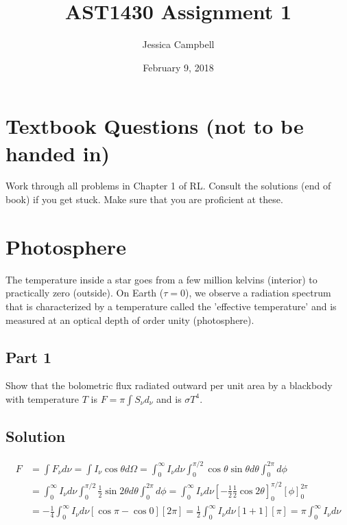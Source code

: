 \documentclass[12pt]{article}
\begin{document}
 
 
\title{AST1430 Assignment 1}
\author{Jessica Campbell}
\date{February 9, 2018}
\maketitle


\section{Textbook Questions (not to be handed in)}

Work through all problems in Chapter 1 of RL. Consult the solutions (end of book) if you get stuck. Make sure that you are proficient at these.

\section{Photosphere}

The temperature inside a star goes from a few million kelvins (interior) to practically zero (outside). On Earth ($\tau=0$), we observe a radiation spectrum that is characterized by a temperature called the ’effective temperature’ and is measured at an optical depth of order unity (photosphere).\\

\subsection*{Part 1}

{\noindent}Show that the bolometric flux radiated outward per unit area by a blackbody with temperature $T$ is $F = {\pi}{\int}S_{\nu}d_{\nu}$ and is ${\sigma}T^4$.

\subsection*{Solution}

\begin{equation*}
\begin{split}
F &= \int F_\nu d\nu = \int I_\nu \cos \theta d\Omega = \int_{0}^{\infty}I_\nu d\nu \int_0^{\pi/2}\cos\theta\sin\theta d\theta \int_0^{2\pi}d\phi \\
&= \int_0^{\infty}I_\nu d\nu \int_0^{\pi/2}\frac{1}{2}\sin2\theta d\theta \int_0^{2\pi}d\phi = \int_0^{\infty}I_\nu d\nu \left[-\frac{1}{2}\frac{1}{2}\cos2\theta\right]_0^{\pi/2}[\phi]_0^{2\pi} \\
&= -\frac{1}{4}\int_0^{\infty}I_\nu d\nu[\cos\pi - \cos0][2\pi] = \frac{1}{2}\int_0^{\infty}I_\nu d\nu[1+1][\pi] = \pi\int_0^{\infty}I_\nu d\nu
\end{split}
\end{equation*}
\end{document}
